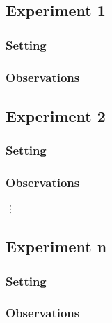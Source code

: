 \documentclass[11pt]{article}
\begin{document}
\subsection{Experiment 1}

\subsubsection{Setting}

\subsubsection{Observations}

\subsection{Experiment 2}

\subsubsection{Setting}

\subsubsection{Observations}

\vdots

\subsection{Experiment n}

\subsubsection{Setting}

\subsubsection{Observations}
\end{document}
